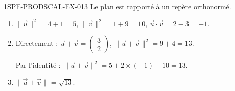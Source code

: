 \begin{corrige}{1SPE-PRODSCAL-EX-013}
Le plan est rapporté à un repère orthonormé.

\begin{enumerate}
\item $\|\vec{u}\|^2 = 4 + 1 = 5$, $\|\vec{v}\|^2 = 1 + 9 = 10$, $\vec{u} \cdot \vec{v} = 2 - 3 = -1$.
\item Directement : $\vec{u} + \vec{v} = \begin{pmatrix} 3 \\ 2 \end{pmatrix}$, $\|\vec{u} + \vec{v}\|^2 = 9 + 4 = 13$.

Par l'identité : $\|\vec{u} + \vec{v}\|^2 = 5 + 2 \times (-1) + 10 = 13$. \checkmark
\item $\|\vec{u} + \vec{v}\| = \sqrt{13}$.
\end{enumerate}
\end{corrige}
